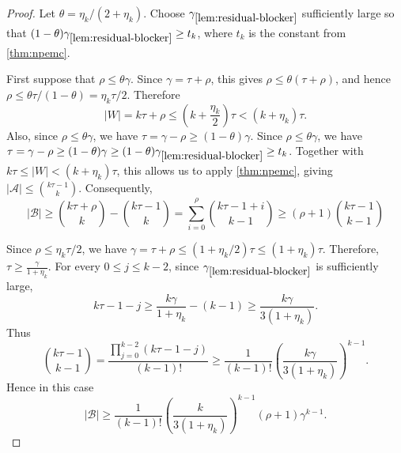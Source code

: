 \documentclass[10pt,a4paper]{article}
\numberwithin{equation}{section}
\theoremstyle{definition}
\newcommand{\A}{\mathcal A}
\newcommand{\B}{\mathcal B}
\begin{document}
\begin{proof}
        Let $\theta=\eta_k/(2+\eta_k)$.
        Choose $\gamma_{\ref{lem:residual-blocker}}$ sufficiently large so that $(1-\theta)\gamma_{\ref{lem:residual-blocker}}\ge t_k$, where \(t_k\) is the constant from \cref{thm:npemc}.

        First suppose that $\rho\le\theta\gamma$.
        Since $\gamma=\tau+\rho$, this gives $\rho\le \theta(\tau+\rho)$, and hence $\rho\le \theta\tau/(1-\theta)={\eta_k}\tau/2$.
        Therefore
        \[
                |W|=k\tau+\rho
                \le \left(k+\frac{\eta_k}{2}\right)\tau
                <(k+\eta_k)\tau.
        \]
        Also, since $\rho\le\theta\gamma$, we have $\tau=\gamma-\rho\ge (1-\theta)\gamma$.
        Since $\rho\le\theta\gamma$, we have $\tau=\gamma-\rho\ge(1-\theta)\gamma
                \ge(1-\theta)\gamma_{\ref{lem:residual-blocker}}
                \ge t_k$.
        Together with \(k\tau\le |W|<(k+\eta_k)\tau\), this allows us to apply \cref{thm:npemc}, giving $|\A|\le\binom{k\tau-1}{k}$.
        Consequently,
        \[
                |\B|
                \ge
                \binom{k\tau+\rho}{k}-\binom{k\tau-1}{k}=
                \sum_{i=0}^{\rho}\binom{k\tau-1+i}{k-1}\ge
                (\rho+1)\binom{k\tau-1}{k-1}
        \]


        Since $\rho\le{\eta_k}\tau/2$, we have $\gamma=\tau+\rho\le \left(1+\eta_k/2\right)\tau\le (1+\eta_k)\tau$.
        Therefore, $\tau\ge \frac{\gamma}{1+\eta_k}$.
        For every $0\le j\le k-2$, since $\gamma_{\ref{lem:residual-blocker}}$ is sufficiently large,
        \[
                k\tau-1-j
                \ge
                \frac{k\gamma}{1+\eta_k}-(k-1)
                \ge
                \frac{k\gamma}{3(1+\eta_k)}.
        \]
        Thus
        \[
                \binom{k\tau-1}{k-1}
                =
                \frac{\prod_{j=0}^{k-2}(k\tau-1-j)}{(k-1)!}
                \ge
                \frac{1}{(k-1)!}
                \left(\frac{k\gamma}{3(1+\eta_k)}\right)^{k-1}.
        \]
        Hence in this case
        \[
                |\B|
                \ge
                \frac{1}{(k-1)!}
                \left(\frac{k}{3(1+\eta_k)}\right)^{k-1}
                (\rho+1)\gamma^{k-1}.
        \]


\end{proof}
\end{document}
